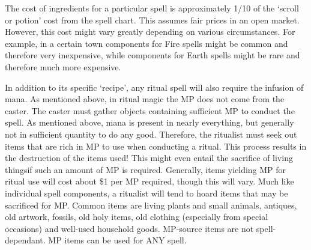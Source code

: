 \documentclass[twoside]{book}
\begin{document}
    {  
     The cost of ingredients for a particular spell is
               approximately 1/10 of the `scroll or potion'
               cost from the spell chart. This assumes fair prices in an
               open market. However, this cost might vary greatly
               depending on various circumstances. For example, in a
               certain town components for Fire spells might be common
               and therefore very inexpensive, while components for Earth
               spells might be rare and therefore much more expensive.
               
    }
  
    {  
     In addition to its specific `recipe',
               any ritual spell will also require the infusion of mana.
               As mentioned above, in ritual magic the MP does not come
               from the caster. The caster must gather objects containing
               sufficient MP to conduct the spell. As mentioned above,
               mana is present in nearly everything, but generally not in
               sufficient quantity to do any good. Therefore, the
               ritualist must seek out items that are rich in MP to use
               when conducting a ritual. This process results in the
               destruction of the items used! This might even entail the
               sacrifice of living thingsif such an amount of MP
               is required. Generally, items yielding MP for ritual use
               will cost about \$1 per MP required, though this will vary.
               Much like individual spell components, a ritualist will
               tend to hoard items that may be sacrificed for MP. Common
               items are living plants and small animals, antiques, old
               artwork, fossils, old holy items, old clothing (especially
               from special occasions) and well-used household goods.
               MP-source items are not spell-dependant. MP items can be
               used for ANY spell. 
    }
  
\end{document}
